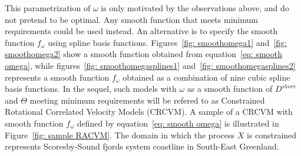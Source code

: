 \documentclass[11pt]{article}
\newcommand {\1}{\mathbb{1}}
\theoremstyle{definition}
\theoremstyle{remark}
\theoremstyle{remark}
\begin{document}
This parametrization of $\omega$ is only motivated by the observations above, and do not pretend to be optimal. Any smooth function that meets minimum requirements could be used instead. An alternative is to specify the smooth function $f_{\omega}$ using spline basis functions. Figures~\ref{fig: smoothomega1} and~\ref{fig: smoothomega2} show a smooth function obtained from equation~\ref{eq: smooth omega}, while figures~\ref{fig: smoothomegasplines1} and~\ref{fig: smoothomegasplines2}  represents a smooth function $f_{\omega}$ obtained as a combination of nine cubic spline basis functions. In the sequel, such models with $\omega$ as a smooth function of $D^{shore}$ and $\Theta$ meeting minimum requirements will be refered to as Constrained Rotational Correlated Velocity Models (CRCVM). A sample of a CRCVM with smooth function $f_{\omega}$ defined by equation~\ref{eq: smooth omega} is illustrated in Figure~\ref{fig: sample RACVM}. The domain in which the process $X$ is constrained represents Scoresby-Sound fjords system coastline in South-East Greenland.
\end{document}
